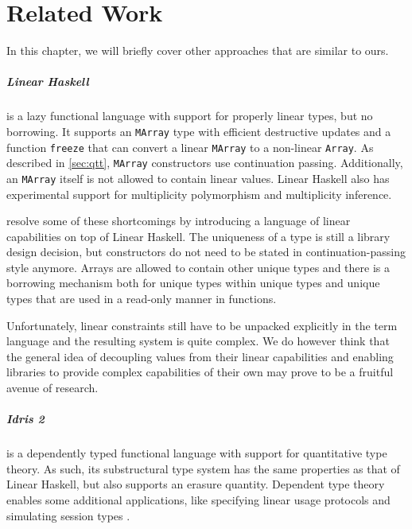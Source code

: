 \chapter{Related Work}\label{sec:relatedwork}
In this chapter, we will briefly cover other approaches that are similar to ours.

\paragraph{Linear Haskell} \citep{bernardy_linear_2018} is a lazy functional language with support for properly linear types, but no borrowing. It supports an \lstinline|MArray| type with efficient destructive updates and a function \lstinline|freeze| that can convert a linear \lstinline|MArray| to a non-linear \lstinline|Array|. As described in \cref{sec:qtt}, \lstinline|MArray| constructors use continuation passing. Additionally, an \lstinline|MArray| itself is not allowed to contain linear values. Linear Haskell also has experimental support for multiplicity polymorphism and multiplicity inference.

\cite{spiwack_linearly_2022} resolve some of these shortcomings by introducing a language of linear capabilities on top of Linear Haskell. The uniqueness of a type is still a library design decision, but constructors do not need to be stated in continuation-passing style anymore. Arrays are allowed to contain other unique types and there is a borrowing mechanism both for unique types within unique types and unique types that are used in a read-only manner in functions. 

Unfortunately, linear constraints still have to be unpacked explicitly in the term language and the resulting system is quite complex. We do however think that the general idea of decoupling values from their linear capabilities and enabling libraries to provide complex capabilities of their own may prove to be a fruitful avenue of research.

\paragraph{Idris 2} \citep{brady_idris_2021} is a dependently typed functional language with support for quantitative type theory. As such, its substructural type system has the same properties as that of Linear Haskell, but also supports an erasure quantity. Dependent type theory enables some additional applications, like specifying linear usage protocols and simulating session types \citep{honda_types_1993}.

